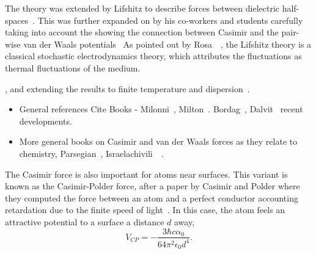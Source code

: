 The theory was extended by Lifshitz to describe forces between dielectric half-spaces~\cite{Lifshitz1956}.
This was further expanded on by his co-workers and students carefully taking into account the   
showing the connection between Casimir and the pair-wise van der Waals potentials~
\cite{Dzyaloshinskii1959,Dzyaloshinskii1961}
As pointed out by Rosa~\etal~\cite{Rosa2010}, the Lifshitz theory is a classical stochastic electrodynamics theory,
which attributes the fluctuations as thermal fluctuations of the medium.  

, and extending 
the results to finite temperature and dispersion~\cite{BarashGinzburg1975}.  


\begin{itemize}
\end{itemize}

\begin{itemize}
\item General references Cite Books - Milonni~\cite{Milonni1994}, Milton~\cite{Milton2001}.
  Bordag~\cite{Bordag2009}, Dalvit~\cite{Dalvit2011} recent developments.  
\item More general books on Casimir and van der Waals forces as they relate to chemistry, 
  Parsegian~\cite{Parsegian2006}, Israelachivili~\etal~\cite{Israelachvili2011}.
\end{itemize}


The Casimir force is also important for atoms near surfaces.  
This variant is known as the Casimir-Polder force, 
after a paper by Casimir and Polder where they computed the force between an 
atom and a perfect conductor accounting retardation due to the finite speed 
of light~\cite{CasimirPolder1948}.  
In this case, the atom feels an attractive potential to a surface a distance $d$ away,
\begin{equation}
V_{CP} =-\frac{3\hbar c\alpha_0}{64\pi^2\epsilon_0 d^4}.
\end{equation}

